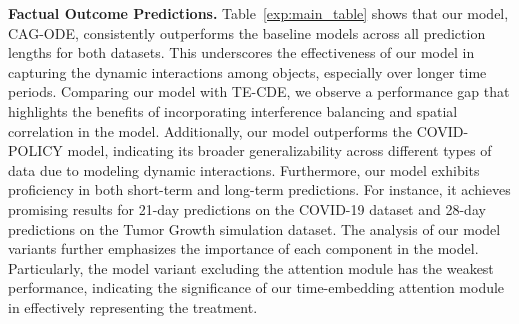 \textbf{Factual Outcome Predictions.} 
 Table~\ref{exp:main_table} shows that our model, CAG-ODE, consistently outperforms the baseline models across all prediction lengths for both datasets. This underscores the effectiveness of our model in capturing the dynamic interactions among objects, especially over longer time periods. Comparing our model with  TE-CDE, we observe a performance gap that highlights the benefits of incorporating interference balancing and spatial correlation in the model. Additionally, our model outperforms the COVID-POLICY model, indicating its broader generalizability across different types of data due to modeling dynamic interactions. 
 Furthermore, our model exhibits proficiency in both short-term and long-term predictions. For instance, it achieves promising results for 21-day predictions on the COVID-19 dataset and 28-day predictions on the Tumor Growth simulation dataset.  The analysis of our model variants further emphasizes the importance of each component in the model. Particularly, the model variant excluding the attention module has the weakest performance, indicating the significance of our time-embedding attention module in effectively representing the treatment.

